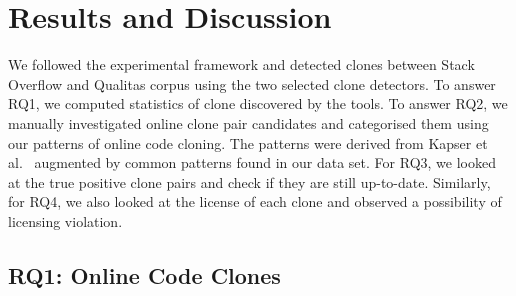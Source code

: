 \documentclass{sig-alternate-05-2015}
\begin{document}
\section{Results and Discussion}

We followed the experimental framework and detected clones between Stack Overflow and Qualitas corpus using the two selected clone detectors. To answer RQ1, we computed statistics of clone discovered by the tools. To answer RQ2, we manually investigated online clone pair candidates and categorised them using our patterns of online code cloning. The patterns were derived from Kapser et al.~\cite{Kapser2003} augmented by common patterns found in our data set. For RQ3, we looked at the true positive clone pairs and check if they are still up-to-date. Similarly, for RQ4, we also looked at the license of each clone and observed a possibility of licensing violation.

\subsection{RQ1: Online Code Clones} 

\begin{table}
	\centering
	\caption{Statistics of clones found between Stack Overflow and Qualitas projects using Simian (\textit{S}) and NiCad (\textit{N}) with default (\textit{D}) and EvaClone (\textit{E}) configurations}
	\label{tab:raw_stats}
	\small
\end{table}
\end{document}
